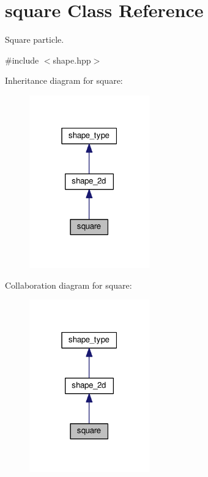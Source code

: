 \hypertarget{classsquare}{}\section{square Class Reference}
\label{classsquare}


Square particle.  




{\ttfamily \#include $<$shape.\+hpp$>$}



Inheritance diagram for square\+:
\nopagebreak
\begin{figure}[H]
\begin{center}
\leavevmode
\includegraphics[width=147pt]{d9/d29/classsquare__inherit__graph}
\end{center}
\end{figure}


Collaboration diagram for square\+:
\nopagebreak
\begin{figure}[H]
\begin{center}
\leavevmode
\includegraphics[width=147pt]{d9/d22/classsquare__coll__graph}
\end{center}
\end{figure}
